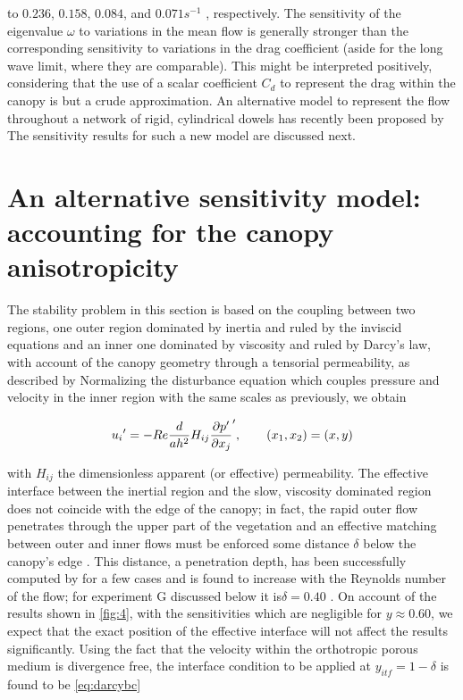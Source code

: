 to $0.236$, $0.158$, $0.084$, and $0.071 s^{-1}$ , respectively. The sensitivity of the eigenvalue $\omega$ to variations
in the mean flow is generally stronger than the corresponding sensitivity to variations in the drag
coefficient (aside for the long wave limit, where they are comparable). This might be interpreted
positively, considering that the use of a scalar coefficient $C_d$ to represent the drag within the canopy
is but a crude approximation. An alternative model to represent the flow throughout a network of
rigid, cylindrical dowels has recently been proposed by \citet{zampogna2016instability} The sensitivity results for
such a new model are discussed next.


\section{An alternative sensitivity model: accounting for the canopy anisotropicity}
\label{sec:4}

The stability problem in this section is based on the coupling between two regions, one outer
region dominated by inertia and ruled by the inviscid equations and an inner one dominated by
viscosity and ruled by Darcy’s law, with account of the canopy geometry through a tensorial
permeability, as described by \citet{zampogna2016instability} Normalizing the disturbance equation which couples
pressure and velocity in the inner region with the same scales as previously, we obtain

\begin{equation}
{u_i}' = -Re \dfrac{d}{ah^2} {H}_{ij} \dfrac{\partial p'}{\partial {}x_j}',  \qquad (x_1, x_2) = (x,y)
\label{eq:darcy}
\end{equation}


with ${H}_{ij}$ the dimensionless apparent (or effective) permeability. The effective interface between the inertial region and the
slow, viscosity dominated region does not coincide with the edge of the canopy; in fact, the rapid
outer flow penetrates through the upper part of the vegetation and an effective matching between
outer and inner flows must be enforced some distance $\delta$ below the canopy’s edge \citet{le2006interfacial}.  This distance,
a penetration depth, has been successfully computed by \citet{zampogna2016fluid} for a few cases
and is found to increase with the Reynolds number of the flow; for experiment G discussed below it
is$ \delta = 0.40$ \citet{zampognaprivate}. On account of the results shown in \ref{fig:4}, with the sensitivities which are negligible
for $y \approx 0.60$, we expect that the exact position of the effective interface will not affect the results
significantly.
Using the fact that the velocity within the orthotropic porous medium is divergence free, the
interface condition to be applied at $y_{itf} = 1 - \delta$ is found to be \ref{eq:darcybc}

